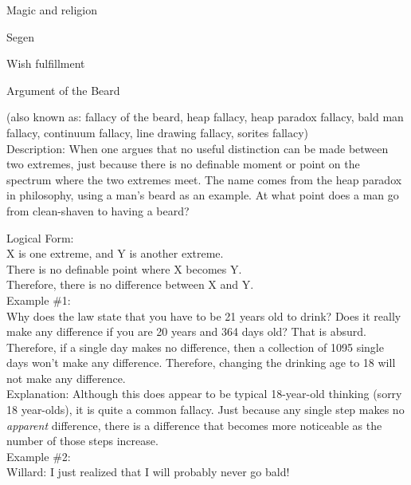 \documentclass[a4paper,12pt,single,pdftex]{scrartcl}
\begin{document}
Magic and religion

Segen

Wish fulfillment

Argument of the Beard
    
      (also known as: fallacy of the beard, heap fallacy, heap paradox fallacy, bald man fallacy, continuum fallacy, line drawing fallacy, sorites fallacy)
    \\

  
    Description: When one argues that no useful distinction can be made between two extremes, just because there is no definable moment or point on the spectrum where the two extremes meet.  The name comes from the heap paradox in philosophy, using a man’s beard as an example.  At what point does a man go from clean-shaven to having a beard?

    
      Logical Form:
    \\

    
      X is one extreme, and Y is another extreme.
    \\

    
      There is no definable point where X becomes Y.
    \\

    
      Therefore, there is no difference between X and Y.
    \\

    
      Example \#1:
    \\

    
      Why does the law state that you have to be 21 years old to drink?  Does it really make any difference if you are 20 years and 364 days old?  That is absurd.  Therefore, if a single day makes no difference, then a collection of 1095 single days won’t make any difference. Therefore, changing the drinking age to 18 will not make any difference.
    \\

    
      Explanation: Although this does appear to be typical 18-year-old thinking (sorry 18 year-olds), it is quite a common fallacy.  Just because any single step makes no {\it apparent} difference, there is a difference that becomes more noticeable as the number of those steps increase.
    \\

    
      Example \#2:
    \\

    
      Willard: I just realized that I will probably never go bald!
    \\
\end{document}

